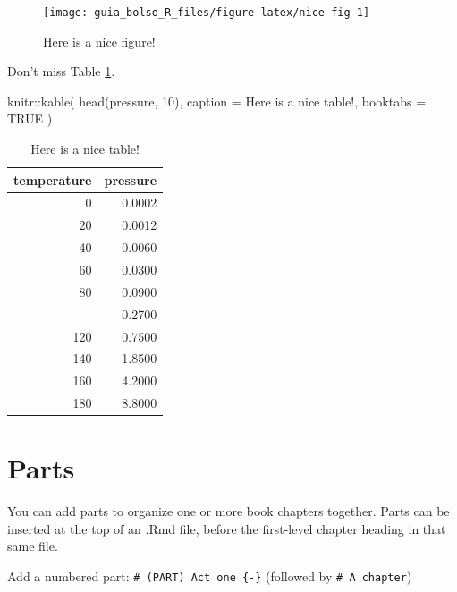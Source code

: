 \documentclass[
]{book}
\newenvironment{Shaded}{\begin{snugshade}}{\end{snugshade}}
\newcommand{\AttributeTok}[1]{\textcolor[rgb]{0.77,0.63,0.00}{#1}}
\newcommand{\ConstantTok}[1]{\textcolor[rgb]{0.00,0.00,0.00}{#1}}
\newcommand{\DecValTok}[1]{\textcolor[rgb]{0.00,0.00,0.81}{#1}}
\newcommand{\FunctionTok}[1]{\textcolor[rgb]{0.00,0.00,0.00}{#1}}
\newcommand{\NormalTok}[1]{#1}
\newcommand{\SpecialCharTok}[1]{\textcolor[rgb]{0.00,0.00,0.00}{#1}}
\newcommand{\StringTok}[1]{\textcolor[rgb]{0.31,0.60,0.02}{#1}}
\theoremstyle{definition}
\theoremstyle{definition}
\theoremstyle{definition}
\theoremstyle{definition}
\theoremstyle{remark}
\begin{document}
\begin{figure}

{\centering \texttt{[image: guia\_bolso\_R\_files/figure-latex/nice-fig-1]} 

}

\caption{Here is a nice figure!}\label{fig:nice-fig}
\end{figure}

Don't miss Table \ref{tab:nice-tab}.

\begin{Shaded}
\begin{Highlighting}[]
\NormalTok{knitr}\SpecialCharTok{::}\FunctionTok{kable}\NormalTok{(}
  \FunctionTok{head}\NormalTok{(pressure, }\DecValTok{10}\NormalTok{), }\AttributeTok{caption =} \StringTok{\textquotesingle{}Here is a nice table!\textquotesingle{}}\NormalTok{,}
  \AttributeTok{booktabs =} \ConstantTok{TRUE}
\NormalTok{)}
\end{Highlighting}
\end{Shaded}

\begin{table}

\caption{\label{tab:nice-tab}Here is a nice table!}
\centering
\begin{tabular}[t]{rr}
\toprule
temperature & pressure\\
\midrule
0 & 0.0002\\
20 & 0.0012\\
40 & 0.0060\\
60 & 0.0300\\
80 & 0.0900\\
\addlinespace
100 & 0.2700\\
120 & 0.7500\\
140 & 1.8500\\
160 & 4.2000\\
180 & 8.8000\\
\bottomrule
\end{tabular}
\end{table}

\hypertarget{parts}{%
\chapter{Parts}\label{parts}}

You can add parts to organize one or more book chapters together. Parts can be inserted at the top of an .Rmd file, before the first-level chapter heading in that same file.

Add a numbered part: \texttt{\#\ (PART)\ Act\ one\ \{-\}} (followed by \texttt{\#\ A\ chapter})
\end{document}
